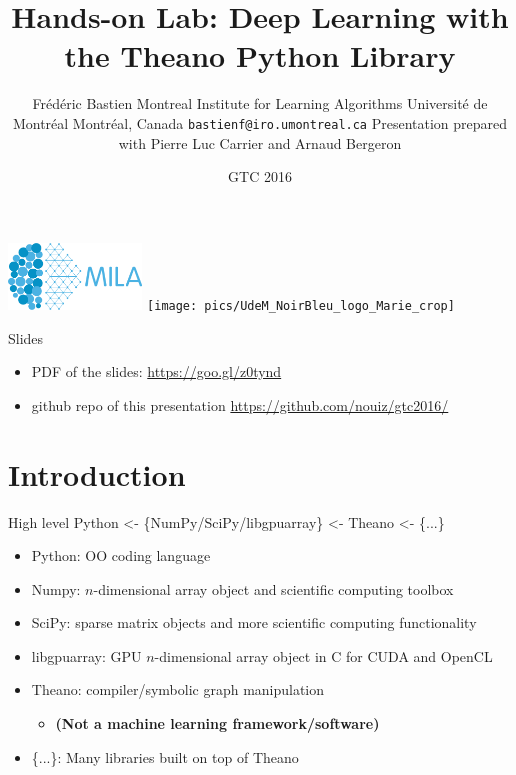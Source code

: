\documentclass[utf8x,xcolor=pdftex,dvipsnames,table]{beamer}
\title{Hands-on Lab: Deep Learning with the Theano Python Library}
\author{%
\footnotesize
Frédéric Bastien \newline
\newline
\newline
Montreal Institute for Learning Algorithms \newline
Université de Montréal \newline
Montréal, Canada \newline
\texttt{bastienf@iro.umontreal.ca} \newline \newline
Presentation prepared with Pierre Luc Carrier and Arnaud Bergeron
}
\date{GTC 2016}
\begin{document}
\begin{frame}[plain]
 \titlepage
 \vspace{-5em}
 \includegraphics[width=1.4in]{pics/MILA.png}
 \hfill
 \texttt{[image: pics/UdeM\_NoirBleu\_logo\_Marie\_crop]}
\end{frame}

\begin{frame}{Slides}
\begin{itemize}
 \item PDF of the slides: \url{https://goo.gl/z0tynd}
 \item github repo of this presentation \url{https://github.com/nouiz/gtc2016/}
\end{itemize}
\end{frame}

\section{Introduction}
\begin{frame}
  \tableofcontents[currentsection]
\end{frame}

\begin{frame}{High level}\setcounter{page}{1}
  Python <- \{NumPy/SciPy/libgpuarray\} <- Theano <- \{...\}
  \begin{itemize}
  \item Python: OO coding language
  \item Numpy: $n$-dimensional array object and scientific computing toolbox
  \item SciPy: sparse matrix objects and more scientific computing functionality
  \item libgpuarray: GPU $n$-dimensional array object in C for CUDA and OpenCL
  \item Theano: compiler/symbolic graph manipulation
    \begin{itemize}
    \item \bf{(Not a machine learning framework/software)}
    \end{itemize}
  \item \{...\}: Many libraries built on top of Theano
  \end{itemize}
\end{frame}
\end{document}
